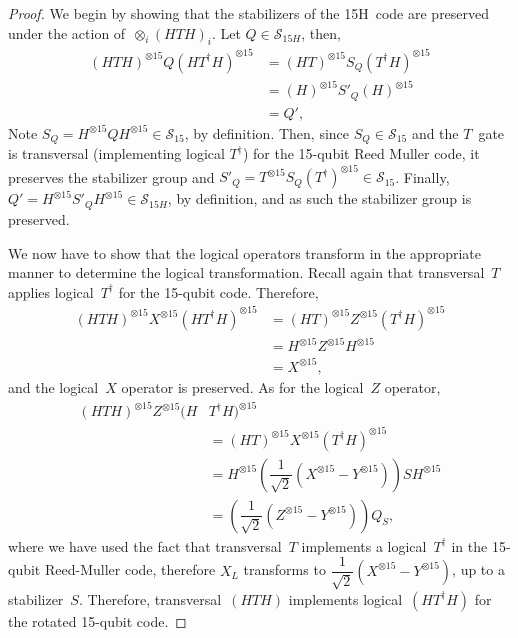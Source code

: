 \documentclass[pra,longbibliography,twocolumn,showpacs,nofootinbib,superscriptaddress,notitlepage]{revtex4-1}
\begin{document}
\begin{proof}
We begin by showing that the stabilizers of the 15H~code are preserved under the action of~$\otimes_i (HTH)_i$. Let $Q \in \mathcal{S}_{15H}$, then,
\begin{align*}
(HTH)^{\otimes 15} Q (HT^{\dagger}H)^{\otimes 15} &= (HT)^{\otimes 15} S_Q (T^{\dagger}H)^{\otimes 15} \\
&= (H)^{\otimes 15} S'_Q (H)^{\otimes 15}\\
&= Q',
\end{align*}
Note $S_Q = H^{\otimes 15} Q H^{\otimes 15} \in \mathcal{S}_{15}$, by definition. Then, since $S_Q \in \mathcal{S}_{15}$ and the $T$~gate is transversal (implementing logical $T^{\dagger}$) for the 15-qubit Reed Muller code, it preserves the stabilizer group and $S'_Q = T^{\otimes 15} S_Q (T^{\dagger})^{\otimes 15} \in \mathcal{S}_{15}$. Finally, $ Q' = H^{\otimes 15} S'_Q H^{\otimes 15} \in \mathcal{S}_{15H}$, by definition, and as such the stabilizer group is preserved.

We now have to show that the logical operators transform in the appropriate manner to determine the logical transformation. Recall again that transversal~$T$ applies logical~$T^{\dagger}$ for the 15-qubit code. Therefore,
\begin{align*}
(HTH)^{\otimes 15} X^{\otimes 15} (HT^{\dagger} H)^{\otimes 15} &= (HT)^{\otimes 15} Z^{\otimes 15} (T^{\dagger} H)^{\otimes 15} \\
&= H^{\otimes 15} Z^{\otimes 15} H^{\otimes 15} \\
&= X^{\otimes 15}, 
\end{align*}
and the logical~$X$ operator is preserved. As for the logical~$Z$ operator,
\begin{align*}
(HTH)^{\otimes 15} Z^{\otimes 15}  (H & T^{\dagger} H)^{\otimes 15} \\
&= (HT)^{\otimes 15} X^{\otimes 15} (T^{\dagger} H)^{\otimes 15} \\
&= H^{\otimes 15} \left(\dfrac{1}{\sqrt{2}}(X^{\otimes 15} - Y^{\otimes 15}) \right)S H^{\otimes 15} \\
&= \left(\dfrac{1}{\sqrt{2}}(Z^{\otimes 15} - Y^{\otimes 15}) \right)Q_S ,
\end{align*}
where we have used the fact that transversal~$T$ implements a logical~$T^{\dagger}$ in the 15-qubit Reed-Muller code, therefore $X_L$ transforms to $\dfrac{1}{\sqrt{2}}(X^{\otimes 15} - Y^{\otimes 15})$, up to a stabilizer~$S$. Therefore, transversal~$(HTH)$ implements logical~$(HT^{\dagger}H)$ for the rotated 15-qubit code.
\end{proof}
\end{document}
